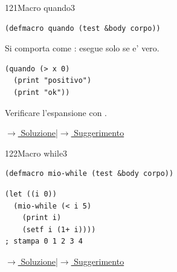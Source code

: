 \bigskip

\bigskip

\label{ex:121}
\begin{stdbox}{121}{Macro quando}{3}
\nopagebreak
\begin{lstlisting}
(defmacro quando (test &body corpo))
\end{lstlisting}
Si comporta come : esegue  solo se  e' vero.
\begin{lstlisting}
(quando (> x 0)
  (print "positivo")
  (print "ok"))
\end{lstlisting}
Verificare l'espansione con .




\small\color{black!55}\hyperref[sol:121]{$\rightarrow$ Soluzione}\enspace\textcolor{black!30}{|}\enspace\hyperref[hint:121]{$\rightarrow$ Suggerimento}\normalsize\color{black}
\end{stdbox}

\label{ex:122}
\begin{stdbox}{122}{Macro while}{3}
\nopagebreak
\begin{lstlisting}
(defmacro mio-while (test &body corpo))
\end{lstlisting}
\begin{lstlisting}
(let ((i 0))
  (mio-while (< i 5)
    (print i)
    (setf i (1+ i))))
; stampa 0 1 2 3 4
\end{lstlisting}

\small\color{black!55}\hyperref[sol:122]{$\rightarrow$ Soluzione}\enspace\textcolor{black!30}{|}\enspace\hyperref[hint:122]{$\rightarrow$ Suggerimento}\normalsize\color{black}
\end{stdbox}

